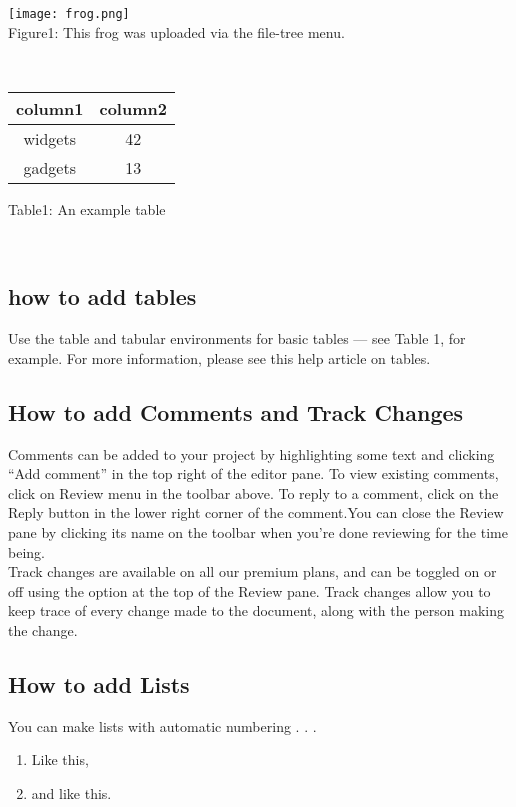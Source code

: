 \documentclass{article}
\begin{document}
	

	\texttt{[image: frog.png]}\\
	\caption{Figure1: This frog was uploaded via the file-tree menu.}
	\label{fig:1}\\
     \centering
	
			\begin{tabular}{c|c}
				
				column1 & column2 \\ 
				\hline
		widgets & 42 \\
				gadgets & 13 \\
		\end{tabular}
		
		\label{fig:tab}
			
		\caption{Table1: An example table}\\
		\begin{flushleft}
		\subsection{how to add tables}	
		Use the table and tabular environments for basic tables — see Table 1, for example. For more information, please see this help article on tables.
		\subsection{How to add Comments and Track Changes}
		Comments can be added to your project by highlighting some text and clicking “Add comment” in the top right of the editor pane. To view existing comments, click on Review menu in the toolbar above. To reply to a comment, click on the Reply button in the lower right corner of the comment.You can close the Review pane by clicking its name on the toolbar when you’re done reviewing for the time being.\\
		   Track changes are available on all our premium plans, and can be toggled on or off using the option at the top of the Review pane. Track changes allow you to keep trace of every change made to the document, along with the person making the change.
		\subsection{How to add Lists}
		You can make lists with automatic numbering . . .
	
		\begin{enumerate}
			\item Like this,
			\item and like this.


\end{enumerate}
\end{flushleft}
\end{document}
